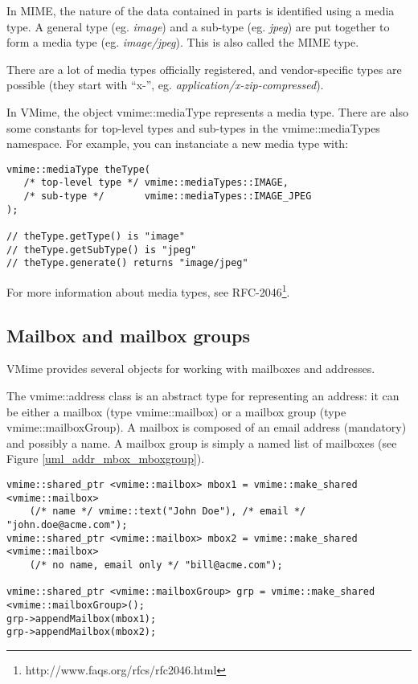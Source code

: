 In MIME, the nature of the data contained in parts is identified using a
media type. A general type (eg. \emph{image}) and a sub-type (eg. \emph{jpeg})
are put together to form a media type (eg. \emph{image/jpeg}). This is also
called the MIME type.

There are a lot of media types officially registered, and vendor-specific
types are possible (they start with ``x-'', eg.
\emph{application/x-zip-compressed}).

In VMime, the object {\vcode vmime::mediaType} represents a media type. There
are also some constants for top-level types and sub-types in the
{\vcode vmime::mediaTypes} namespace. For example, you can instanciate a new
media type with:

\begin{lstlisting}
vmime::mediaType theType(
   /* top-level type */ vmime::mediaTypes::IMAGE,
   /* sub-type */       vmime::mediaTypes::IMAGE_JPEG
);

// theType.getType() is "image"
// theType.getSubType() is "jpeg"
// theType.generate() returns "image/jpeg"
\end{lstlisting}

For more information about media types, see
RFC-2046\footnote{http://www.faqs.org/rfcs/rfc2046.html}.

\subsection{Mailbox and mailbox groups} %

VMime provides several objects for working with mailboxes and addresses.

The {\vcode vmime::address} class is an abstract type for representing an
address: it can be either a mailbox (type {\vcode vmime::mailbox}) or a
mailbox group (type {\vcode vmime::mailboxGroup}). A mailbox is composed of
an email address (mandatory) and possibly a name. A mailbox group is simply
a named list of mailboxes (see Figure \ref{uml_addr_mbox_mboxgroup}).

\begin{lstlisting}[caption={Using mailboxes and mailbox groups}]
vmime::shared_ptr <vmime::mailbox> mbox1 = vmime::make_shared <vmime::mailbox>
    (/* name */ vmime::text("John Doe"), /* email */ "john.doe@acme.com");
vmime::shared_ptr <vmime::mailbox> mbox2 = vmime::make_shared <vmime::mailbox>
    (/* no name, email only */ "bill@acme.com");

vmime::shared_ptr <vmime::mailboxGroup> grp = vmime::make_shared <vmime::mailboxGroup>();
grp->appendMailbox(mbox1);
grp->appendMailbox(mbox2);
\end{lstlisting}

